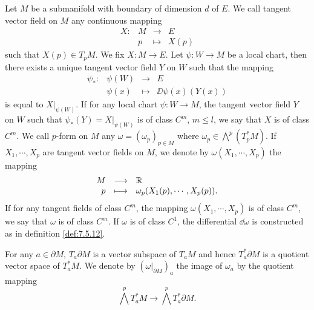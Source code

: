 \begin{definitionenv}
    \quad Let $M$ be a submanifold with boundary of dimension $d$ of $E$.
    We call tangent vector field on $M$ any continuous mapping
    $$\begin{array}{rrcl}
        X : & M & \longrightarrow & E\\
        & p & \longmapsto & X (p)
    \end{array}$$
    such that $X(p) \in T_p M$.
    We fix $X : M \longrightarrow E$.
    Let $\psi : W \longrightarrow M$ be a local chart, then there exists a unique tangent vector field $Y$ on $W$ such that the mapping
    $$\begin{array}{rrcl}
        \psi_* : & \psi(W) & \longrightarrow & E\\
        & \psi(x) & \longmapsto & \DD \psi(x) (Y(x))
    \end{array}$$
    is equal to $X|_{\psi(W)}$.
    If for any local chart $\psi : W \longrightarrow M$, the tangent vector field $Y$ on $W$ such that $\psi_*(Y) = X|_{\psi(W)}$ is of class $C^m$, $m \le l$, we say that $X$ is of class $C^m$.
    We call $p$-form on $M$ any $\omega = (\omega_p)_{p \in M}$ where $\omega_p \in \bigwedge^p (T^*_pM)$.
    If $X_1,\cdots,X_p$ are tangent vector fields on $M$, we denote by $\omega(X_1,\cdots,X_p)$ the mapping
    $$\begin{array}{rcl}
        M & \longrightarrow & \mathbb{R}\\
        p & \longmapsto & \omega_p (X_1(p),\cdots,X_p(p)).
    \end{array}$$
    If for any tangent fields of class $C^m$, the mapping $\omega(X_1,\cdots,X_p)$ is of class $C^m$, we say that $\omega$ is of class $C^m$.
    If $\omega$ is of class $C^1$, the differential $\dd \omega$ is constructed as in definition \ref{def:7.5.12}.

    \quad For any $a \in \partial M$, $T_a \partial M$ is a vector subspace of $T_a M$ and hence $T^*_a \partial M$ is a quotient vector space of $T^*_a M$.
    We denote by $(\omega|_{\partial M})_{a}$ the image of $\omega_a$ by the quotient mapping
    $$\bigwedge^p T^*_a M \longrightarrow \bigwedge^p T^*_a \partial M.$$
\end{definitionenv}

